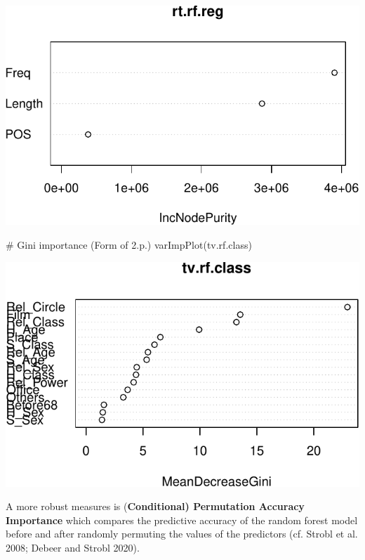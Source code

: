 \documentclass[
  11pt,
  letterpaper,
  DIV=11,
  numbers=noendperiod]{scrreprt}
\newenvironment{Shaded}{\begin{snugshade}}{\end{snugshade}}
\newcommand{\CommentTok}[1]{\textcolor[rgb]{0.37,0.37,0.37}{#1}}
\newcommand{\FunctionTok}[1]{\textcolor[rgb]{0.28,0.35,0.67}{#1}}
\newcommand{\NormalTok}[1]{\textcolor[rgb]{0.00,0.23,0.31}{#1}}
\begin{document}
\includegraphics{Decision_trees_and_random_forests_files/figure-pdf/unnamed-chunk-9-1.pdf}

\begin{Shaded}
\begin{Highlighting}[]
\CommentTok{\# Gini importance (Form of 2.p.)}
\FunctionTok{varImpPlot}\NormalTok{(tv.rf.class)}
\end{Highlighting}
\end{Shaded}

\includegraphics{Decision_trees_and_random_forests_files/figure-pdf/unnamed-chunk-9-2.pdf}

A more robust measures is (\textbf{Conditional) Permutation Accuracy
Importance} which compares the predictive accuracy of the random forest
model before and after randomly permuting the values of the predictors
(cf. Strobl et al. 2008; Debeer and Strobl 2020).
\end{document}
